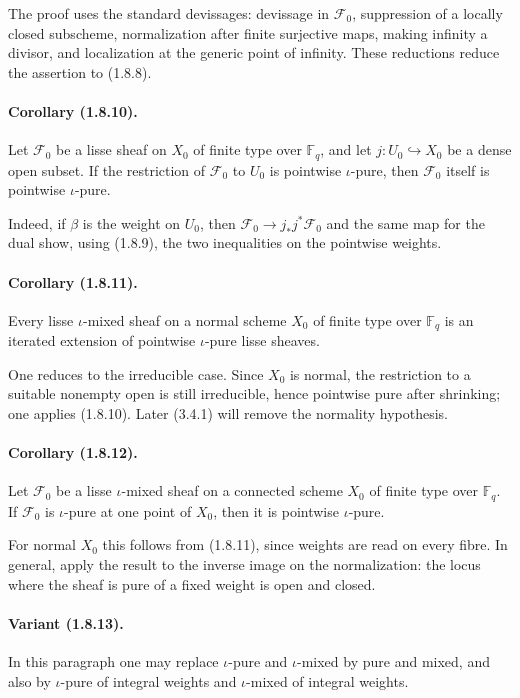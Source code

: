 \documentclass[11pt]{article}
\theoremstyle{remark}
\newcommand{\Fq}{\mathbb{F}_q}
\begin{document}
The proof uses the standard devissages: devissage in $\mathcal F_0$, suppression of a locally closed subscheme, normalization after finite surjective maps, making infinity a divisor, and localization at the generic point of infinity. These reductions reduce the assertion to (1.8.8).

\paragraph{Corollary (1.8.10).} Let $\mathcal F_0$ be a lisse sheaf on $X_0$ of finite type over $\Fq$, and let $j:U_0\hookrightarrow X_0$ be a dense open subset. If the restriction of $\mathcal F_0$ to $U_0$ is pointwise $\iota$-pure, then $\mathcal F_0$ itself is pointwise $\iota$-pure.

Indeed, if $\beta$ is the weight on $U_0$, then $\mathcal F_0\to j_*j^*\mathcal F_0$ and the same map for the dual show, using (1.8.9), the two inequalities on the pointwise weights.

\paragraph{Corollary (1.8.11).} Every lisse $\iota$-mixed sheaf on a normal scheme $X_0$ of finite type over $\Fq$ is an iterated extension of pointwise $\iota$-pure lisse sheaves.

One reduces to the irreducible case. Since $X_0$ is normal, the restriction to a suitable nonempty open is still irreducible, hence pointwise pure after shrinking; one applies (1.8.10). Later (3.4.1) will remove the normality hypothesis.

\paragraph{Corollary (1.8.12).} Let $\mathcal F_0$ be a lisse $\iota$-mixed sheaf on a connected scheme $X_0$ of finite type over $\Fq$. If $\mathcal F_0$ is $\iota$-pure at one point of $X_0$, then it is pointwise $\iota$-pure.

For normal $X_0$ this follows from (1.8.11), since weights are read on every fibre. In general, apply the result to the inverse image on the normalization: the locus where the sheaf is pure of a fixed weight is open and closed.

\paragraph{Variant (1.8.13).} In this paragraph one may replace $\iota$-pure and $\iota$-mixed by pure and mixed, and also by $\iota$-pure of integral weights and $\iota$-mixed of integral weights.
\end{document}
